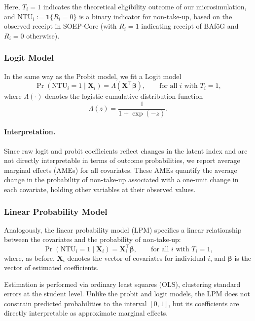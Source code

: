 Here, \( T_i = 1 \) indicates the theoretical eligibility outcome of our microsimulation, and \( \mathrm{NTU}_i := \mathbf{1}\{R_i = 0\} \) is a binary indicator for non-take-up, based on the observed receipt in SOEP-Core (with \( R_i = 1 \) indicating receipt of BAföG and \( R_i = 0 \) otherwise).

\subsubsection{Logit Model}
In the same way as the Probit model, we fit a Logit model
\begin{equation}
  \Pr(\mathrm{NTU}_i = 1 \mid \mathbf{X}_i) = \Lambda(\mathbf{X}^\top \boldsymbol{\beta})
  , \qquad \text{for all } i \text{ with } T_i = 1,
\end{equation}
where \( \Lambda(\cdot) \) denotes the logistic cumulative distribution function
\begin{equation}
  \Lambda(z) = \frac{1}{1 + \exp(-z)}.
\end{equation}

\paragraph{Interpretation.} %
Since raw logit and probit coefficients reflect changes in the latent index and are not directly interpretable in terms of outcome probabilities, we report average marginal effects (AMEs) for all covariates. These AMEs quantify the average change in the probability of non-take-up associated with a one-unit change in each covariate, holding other variables at their observed values.


\subsubsection{Linear Probability Model}
Analogously, the linear probability model (LPM) specifies a linear relationship between the covariates and the probability of non-take-up:
\begin{equation}
  \Pr(\mathrm{NTU}_i = 1 \mid \mathbf{X}_i) = \mathbf{X}_i^\top \boldsymbol{\beta}
  , \qquad \text{for all } i \text{ with } T_i = 1,
\end{equation}
where, as before, \( \mathbf{X}_i \) denotes the vector of covariates for individual \( i \), and \( \boldsymbol{\beta} \) is the vector of estimated coefficients.

Estimation is performed via ordinary least squares (OLS), clustering standard errors at the student level. 
Unlike the probit and logit models, the LPM does not constrain predicted probabilities to the interval \([0,1]\), but its coefficients are directly interpretable as approximate marginal effects.

